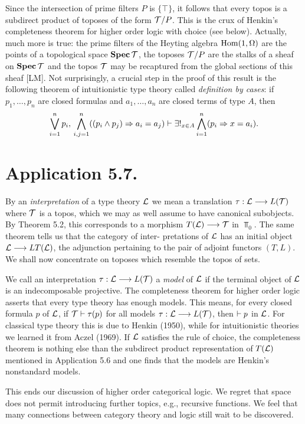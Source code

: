 Since the intersection of prime filters $P$	is $\{\top\}$, it follows that
every topos is a subdirect product of toposes of the form ${\mathcal T}/P$. This is the
crux of Henkin's completeness theorem for higher order logic with choice (see
below). Actually, much more is true: the prime filters of the Heyting
algebra $\operatorname{{Hom}}(1, \Omega)$ are the points of a topological 
space $\mathop{{\mathbf {Spec}}}{\mathcal T}$, the toposes ${\mathcal T}/P$ are the stalks of a 
sheaf on $\mathop{{\mathbf {Spec}}}{\mathcal T}$ and the topos ${\mathcal T}$ may be recaptured
from the global sections of this sheaf [LM]. Not surprisingly, a crucial step
in the proof of this result is the following theorem of intuitionistic type
theory called {\em definition by cases}: if $p_1, \dots, p_n$ are closed formulas
and $a_1, \dots, a_n$ are closed terms of type $A$, then
\[
\bigvee_{i=1}^n p_i,\, \bigwedge_{i,j=1}^n ((p_i \wedge p_j) \Rightarrow a_i = a_j) \vdash
\exists!_{x \in A} \bigwedge_{i=1}^n (p_i \Rightarrow x = a_i).
\]

\section*{Application 5.7.} 

By an {\em interpretation} of a type theory ${\mathcal L}$ we mean a
translation $\tau:{\mathcal L} \longrightarrow L({\mathcal T})$ where ${\mathcal T}$ is a topos, which we may as well assume to
have canonical subobjects. By Theorem 5.2, this corresponds to a morphism
$T({\mathcal L}) \longrightarrow {\mathcal T}$ in $\Top_0$. The same theorem tells us that the category of inter-
pretations of ${\mathcal L}$ has an initial object ${\mathcal L} \longrightarrow LT({\mathcal L})$, the adjunction pertaining
to the pair of adjoint functors $(T,L)$. We shall now concentrate on toposes
which resemble the topos of sets.

We call an interpretation $\tau:{\mathcal L} \longrightarrow L({\mathcal T})$ a {\em model} of ${\mathcal L}$
if the terminal object of ${\mathcal L}$ is an indecomposable projective. The completeness
theorem for higher order logic asserts that every type theory has enough models. This
means, for every closed formula $p$ of ${\mathcal L}$, if ${\mathcal T} \vdash \tau(p)$ for all
models $\tau:{\mathcal L} \longrightarrow L({\mathcal T})$, then $\vdash p$ in ${\mathcal L}$. For classical type theory 
this is due to Henkin (1950), while for intuitionistic theories we learned 
it from Aczel (1969).
If ${\mathcal L}$ satisfies the rule of choice, the completeness theorem is nothing else
than the subdirect product representation of $T({\mathcal L})$ mentioned in
Application 5.6 and one finds that the models are Henkin's nonstandard models.

This ends our discussion of higher order categorical logic. We regret
that space does not permit introducing further topics, e.g., recursive
functions. We feel that many connections between category theory and logic
still wait to be discovered.

